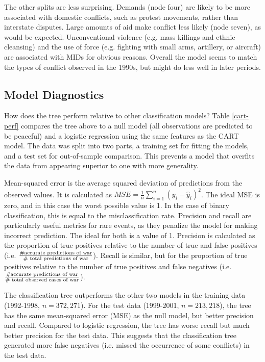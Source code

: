 \documentclass[12pt,letterpaper]{article}
\begin{document}
The other splits are less surprising. Demands (node four) are likely to be more associated with domestic conflicts, such as protest movements, rather than interstate disputes. Large amounts of aid make conflict less likely (node seven), as would be expected. Unconventional violence (e.g. mass killings and ethnic cleansing) and the use of force (e.g. fighting with small arms, artillery, or aircraft) are associated with MIDs for obvious reasons. Overall the model seems to match the types of conflict observed in the 1990s, but might do less well in later periods. 

\subsection{Model Diagnostics}

How does the tree perform relative to other classification models? Table \ref{cart-perf} compares the tree above to a null model (all observations are predicted to be peaceful) and a logistic regression using the same features as the CART model. The data was split into two parts, a training set for fitting the models, and a test set for out-of-sample comparison. This prevents a model that overfits the data from appearing superior to one with more generality. 

Mean-squared error is the average squared deviation of predictions from the observed values. It is calculated as $MSE=\frac{1}{n}\sum_{i=1}^n (y_i - \hat{y}_i)^2$. The ideal MSE is zero, and in this case the worst possible value is 1. In the case of binary classification, this is equal to the misclassification rate. Precision and recall are particularly useful metrics for rare events, as they penalize the model for making incorrect prediction. The ideal for both is a value of 1. Precision is calculated as the proportion of true positives relative to the number of true and false positives (i.e. $\# \text{accurate predictions of war} \over \text{\# total predictions of war}$). Recall is similar, but for the proportion of true positives relative to the number of true positives and false negatives (i.e. $\# \text{accurate predictions of war} \over \text{\# total observed cases of war}$).

The classification tree outperforms the other two models in the training data (1992-1998, $n=372,271$). For the test data (1999-2001, $n=213,218$), the tree has the same mean-squared error (MSE) as the null model, but better precision and recall. Compared to logistic regression, the tree has worse recall but much better precision for the test data. This suggests that the classification tree generated more false negatives (i.e. missed the occurrence of some conflicts) in the test data.
\end{document}
